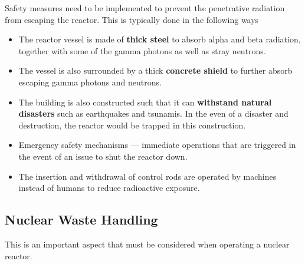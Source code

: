\documentclass[a4paper,12pt]{article}
\begin{document}
Safety measures need to be implemented to prevent the penetrative radiation from escaping the reactor. This is typically done in the following ways
\begin{itemize}
  \item The reactor vessel is made of \textbf{thick steel} to absorb alpha and beta radiation, together with some of the gamma photons as well as stray neutrons.
  \item The vessel is also surrounded by a thick \textbf{concrete shield} to further absorb escaping gamma photons and neutrons.
  \item The building is also constructed such that it can \textbf{withstand natural disasters} such as earthquakes and tsunamis. In the even of a disaster and destruction, the reactor would be trapped in this construction.
  \item Emergency safety mechanisms --- immediate operations that are triggered in the event of an issue to shut the reactor down.
  \item The insertion and withdrawal of control rods are operated by machines instead of humans to reduce radioactive exposure.
\end{itemize}

\pagebreak

\subsection{Nuclear Waste Handling}

This is an important aspect that must be considered when operating a nuclear reactor.
\end{document}
